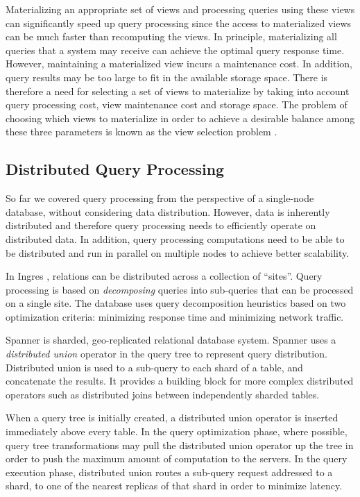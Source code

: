 Materializing an appropriate set of views and processing queries using these views can significantly speed up
query processing since the access to materialized views can be much faster than recomputing the views.
In principle, materializing all queries that a system may receive can achieve the optimal query response time.
However, maintaining a materialized view incurs a maintenance cost.
In addition, query results may be too large to fit in the available storage space.
There is therefore a need for selecting a set of views to materialize by taking into account query processing cost,
view maintenance cost and storage space.
The problem of choosing which views to materialize in order to achieve a desirable balance among these three
parameters is known as the view selection problem \cite{gupta:viewselection, mami:viewselection}.

\subsection{Distributed Query Processing}
\label{sec:distributed_qp}
So far we covered query processing from the perspective of a single-node database, without considering data distribution.
However, data is inherently distributed \cite{corbett:spanner, cockroachdb:docs} and therefore query processing needs to
efficiently operate on distributed data.
In addition, query processing computations need to be able to be distributed and run in parallel on multiple nodes to
achieve better scalability.

In Ingres \cite{epstein:ingres}, relations can be distributed across a collection of ``sites''.
Query processing is based on \textit{decomposing} queries into sub-queries that can be processed on a single site.
The database uses query decomposition heuristics based on two optimization criteria:
minimizing response time and minimizing network traffic.

Spanner \cite{corbett:spanner} is sharded, geo-replicated relational database system.
Spanner uses a \textit{distributed union} operator in the query tree to represent query distribution.
Distributed union is used to a sub-query to each shard of a table, and concatenate the results.
It provides a building block for more complex distributed operators such as distributed joins between independently
sharded tables.

When a query tree is initially created, a distributed union operator is inserted immediately above every table.
In the query optimization phase, where possible, query tree transformations may pull the distributed union operator up
the tree in order to push the maximum amount of computation to the servers.
In the query execution phase, distributed union routes a sub-query request addressed to a shard, to one of the nearest
replicas of that shard in order to minimize latency.

